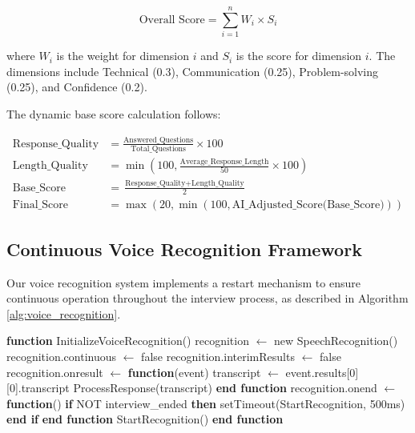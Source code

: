 \documentclass[conference]{IEEEtran}
\begin{document}
\begin{equation}
\text{Overall Score} = \sum_{i=1}^{n} W_i \times S_i
\end{equation}

where $W_i$ is the weight for dimension $i$ and $S_i$ is the score for dimension $i$. The dimensions include Technical (0.3), Communication (0.25), Problem-solving (0.25), and Confidence (0.2).

The dynamic base score calculation follows:

\begin{align}
\text{Response\_Quality} &= \frac{\text{Answered\_Questions}}{\text{Total\_Questions}} \times 100 \\
\text{Length\_Quality} &= \min\left(100, \frac{\text{Average\_Response\_Length}}{50} \times 100\right) \\
\text{Base\_Score} &= \frac{\text{Response\_Quality} + \text{Length\_Quality}}{2} \\
\text{Final\_Score} &= \max(20, \min(100, \text{AI\_Adjusted\_Score(Base\_Score)}))
\end{align}

\subsection{Continuous Voice Recognition Framework}

Our voice recognition system implements a restart mechanism to ensure continuous operation throughout the interview process, as described in Algorithm \ref{alg:voice_recognition}.

\begin{algorithmic}[1]
\STATE \textbf{function} InitializeVoiceRecognition()
\STATE \quad recognition $\leftarrow$ new SpeechRecognition()
\STATE \quad recognition.continuous $\leftarrow$ false
\STATE \quad recognition.interimResults $\leftarrow$ false
\STATE 
\STATE \quad recognition.onresult $\leftarrow$ \textbf{function}(event)
\STATE \quad \quad transcript $\leftarrow$ event.results[0][0].transcript
\STATE \quad \quad ProcessResponse(transcript)
\STATE \quad \textbf{end function}
\STATE 
\STATE \quad recognition.onend $\leftarrow$ \textbf{function}()
\STATE \quad \quad \textbf{if} NOT interview\_ended \textbf{then}
\STATE \quad \quad \quad setTimeout(StartRecognition, 500ms)
\STATE \quad \quad \textbf{end if}
\STATE \quad \textbf{end function}
\STATE 
\STATE \quad StartRecognition()
\STATE \textbf{end function}
\end{algorithmic}
\end{document}

